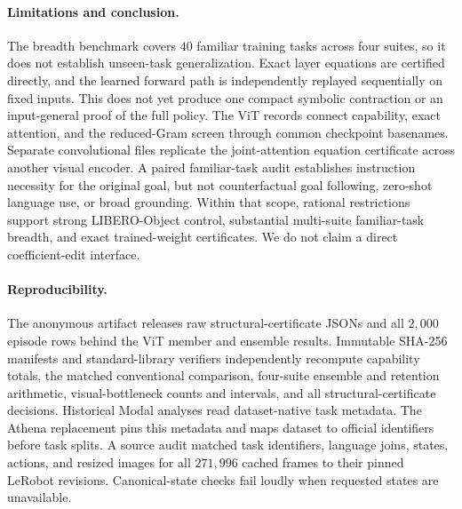 \documentclass{article}
\begin{document}
\paragraph{Limitations and conclusion.}
The breadth benchmark covers $40$ familiar training tasks across four suites, so it does not
establish unseen-task generalization.
Exact layer equations are certified directly, and the learned forward path is independently
replayed sequentially on fixed inputs. This does not yet produce one compact symbolic contraction
or an input-general proof of the full policy. The ViT records connect capability, exact attention, and the
reduced-Gram screen through common checkpoint basenames. Separate convolutional files replicate the joint-attention equation
certificate across another visual encoder. A paired familiar-task audit establishes instruction
necessity for the original goal, but not counterfactual goal following, zero-shot language use, or
broad grounding. Within that scope, rational restrictions support strong LIBERO-Object control,
substantial multi-suite familiar-task breadth, and exact trained-weight certificates. We do not claim a direct
coefficient-edit interface.

\paragraph{Reproducibility.}
The anonymous artifact releases raw structural-certificate JSONs and all $2{,}000$ episode rows
behind the ViT member and ensemble results. Immutable SHA-256 manifests and standard-library
verifiers independently recompute capability totals, the matched conventional comparison,
four-suite ensemble and retention arithmetic, visual-bottleneck counts and intervals, and all
structural-certificate decisions. Historical Modal analyses read dataset-native task metadata.
The Athena replacement pins this metadata and maps dataset to official identifiers before task
splits. A source audit matched task identifiers, language joins, states, actions, and resized images
for all $271{,}996$ cached frames to their pinned LeRobot revisions. Canonical-state checks fail
loudly when requested states are unavailable.
\end{document}
